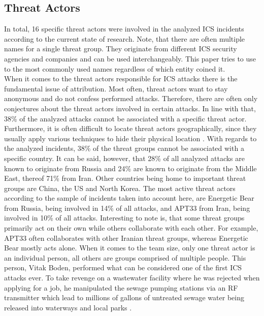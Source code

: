 \documentclass[runningheads]{llncs}
\begin{document}
\subsection{Threat Actors}
In total, 16 specific threat actors were involved in the analyzed ICS incidents according to the current state of research.
Note, that there are often multiple names for a single threat group.
They originate from different ICS security agencies and companies \cite{thaicert.19} and can be used interchangeably.
This paper tries to use to the most commonly used names regardless of which entity coined it.\\
When it comes to the threat actors responsible for ICS attacks there is the fundamental issue of attribution.
Most often, threat actors want to stay anonymous and do not confess performed attacks. %
Therefore, there are often only conjectures about the threat actors involved in certain attacks.
In line with that, 38\% of the analyzed attacks cannot be associated with a specific threat actor.
Furthermore, it is often difficult to locate threat actors geographically, since they usually apply various techniques to hide their physical location \cite{huang.18}.
With regards to the analyzed incidents, 38\% of the threat groups cannot be associated with a specific country.
It can be said, however, that 28\% of all analyzed attacks are known to originate from Russia and 24\% are known to originate from the Middle East, thereof 71\% from Iran.
Other countries being home to important threat groups are China, the US and North Korea.
The most active threat actors according to the sample of incidents taken into account here, are Energetic Bear from Russia, being involved in 14\% of all attacks, and APT33 from Iran, being involved in 10\% of all attacks.
Interesting to note is, that some threat groups primarily act on their own while others collaborate with each other.
For example, APT33 often collaborates with other Iranian threat groups, whereas Energetic Bear mostly acts alone.
When it comes to the team size, only one threat actor is an individual person, all others are groups comprised of multiple people.
This person, Vitak Boden, performed what can be considered one of the first ICS attacks ever.
To take revenge on a wastewater facility where he was rejected when applying for a job, he manipulated the sewage pumping stations via an RF transmitter which lead to millions of gallons of untreated sewage water being released into waterways and local parks \cite{hemsley.18}.
\end{document}

